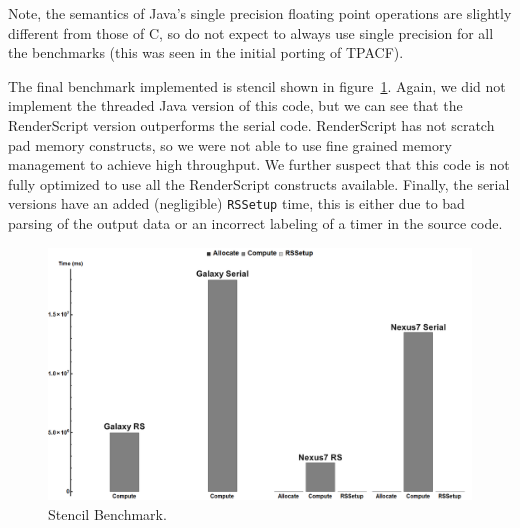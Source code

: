 Note, the semantics of Java's single precision floating point operations are slightly different from those of C, so do not expect 
  to always use single precision for all the benchmarks (this was seen in the initial porting of TPACF).



The final benchmark implemented is stencil shown in figure~\ref{fig:stencil}.
Again, we did not implement the threaded Java version of this code, but we can see that the 
  RenderScript version outperforms the serial code.
RenderScript has not scratch pad memory constructs, so we were not able to use fine grained memory management to achieve high throughput.
We further suspect that this code is not fully optimized to use all the RenderScript constructs available.
Finally, the serial versions have an added (negligible) {\tt RSSetup} time, this is either due to bad parsing of the 
  output data or an incorrect labeling of a timer in the source code.

\begin{figure}[t!]
\includegraphics[scale=0.125]{Stencil_nolog.png}
\caption{Stencil Benchmark.}
\label{fig:stencil}
\centering
\end{figure}


  

